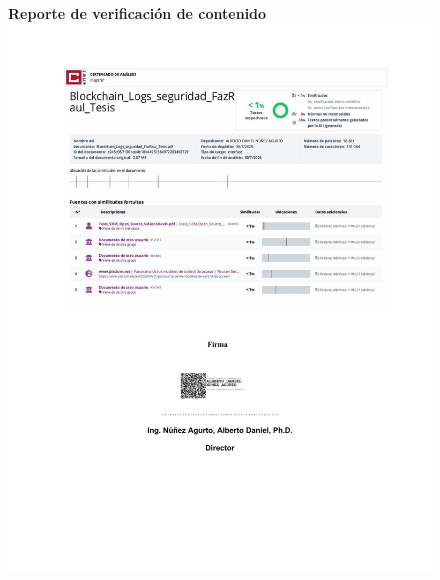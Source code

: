 



\begin{center} 
\thispagestyle{empty}


\end{center}

\begin{figure}[H]
	\centering
    \textbf{Reporte de verificación de contenido}
 \includegraphics[scale=0.7]{figuras/RF_ReportePlagio.pdf}
\end{figure}

